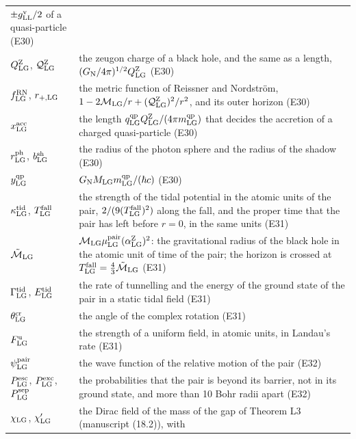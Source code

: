 \documentclass[
  10pt,
]{article}
\begin{document}
\begin{longtable}[]{@{}
  >{\raggedright\arraybackslash}p{}
  >{\raggedright\arraybackslash}p{}@{}}
\(\pm g^{\rm v}_{\rm LL}/2\) of a quasi-particle (E30) \\
\(Q^{\rm Z}_{\rm LG}\), \(\mathcal Q^{\rm Z}_{\rm LG}\) & the zeugon
charge of a black hole, and the same as a length,
\((G_{\rm N}/4\pi)^{1/2}Q^{\rm Z}_{\rm LG}\) (E30) \\
\(f^{\rm RN}_{\rm LG}\), \(r_{+,\rm LG}\) & the metric function of
Reissner and Nordström,
\(1-2\mathcal M_{\rm LG}/r+(\mathcal Q^{\rm Z}_{\rm LG})^2/r^2\), and
its outer horizon (E30) \\
\(x^{\rm acc}_{\rm LG}\) & the length
\(q^{\rm qp}_{\rm LG}Q^{\rm Z}_{\rm LG}/(4\pi m^{\rm qp}_{\rm LG})\)
that decides the accretion of a charged quasi-particle (E30) \\
\(r^{\rm ph}_{\rm LG}\), \(b^{\rm sh}_{\rm LG}\) & the radius of the
photon sphere and the radius of the shadow (E30) \\
\(y^{\rm qp}_{\rm LG}\) &
\(G_{\rm N}M_{\rm LG}m^{\rm qp}_{\rm LG}/(\hbar c)\) (E30) \\
\(\kappa^{\rm tid}_{\rm LG}\), \(T^{\rm fall}_{\rm LG}\) & the strength
of the tidal potential in the atomic units of the pair,
\(2/(9(T^{\rm fall}_{\rm LG})^2)\) along the fall, and the proper time
that the pair has left before \(r=0\), in the same units (E31) \\
\(\tilde{\mathcal M}_{\rm LG}\) &
\(\mathcal M_{\rm LG}\mu^{\rm pair}_{\rm LG}(\alpha^{\rm Z}_{\rm LG})^2\):
the gravitational radius of the black hole in the atomic unit of time of
the pair; the horizon is crossed at
\(T^{\rm fall}_{\rm LG}=\tfrac43\tilde{\mathcal M}_{\rm LG}\) (E31) \\
\(\Gamma^{\rm tid}_{\rm LG}\), \(E^{\rm tid}_{\rm LG}\) & the rate of
tunnelling and the energy of the ground state of the pair in a static
tidal field (E31) \\
\(\theta^{\rm cr}_{\rm LG}\) & the angle of the complex rotation
(E31) \\
\(F^{\rm u}_{\rm LG}\) & the strength of a uniform field, in atomic
units, in Landau's rate (E31) \\
\(\psi^{\rm pair}_{\rm LG}\) & the wave function of the relative motion
of the pair (E32) \\
\(P^{\rm esc}_{\rm LG}\), \(P^{\rm exc}_{\rm LG}\),
\(P^{\rm sep}_{\rm LG}\) & the probabilities that the pair is beyond its
barrier, not in its ground state, and more than 10 Bohr radii apart
(E32) \\
\(\chi_{\rm LG}\), \(\chi'_{\rm LG}\) & the Dirac field of the mass of
the gap of Theorem L3 (manuscript (18.2)), with

\end{longtable}
\end{document}
